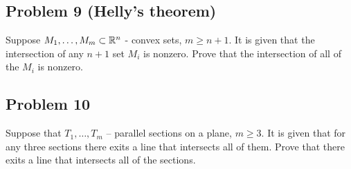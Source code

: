 \subsection{Problem 9 {\rm (Helly's theorem)}}
Suppose $M_1, \dots, M_m\subset \Bbb R^n$ - convex sets, $m \geq
n+1$. It is given that the intersection of any $n+1$ set $M_i$ is
nonzero. Prove that the intersection of all of the $M_i$ is
nonzero.
\subsection{Problem 10}
Suppose that $T_1,\dots, T_m$ -- parallel sections on a plane, $m\geq 3$.
It is given that for any three sections there exits a line that
intersects all of them. Prove that there exits a line that
intersects all of the sections.